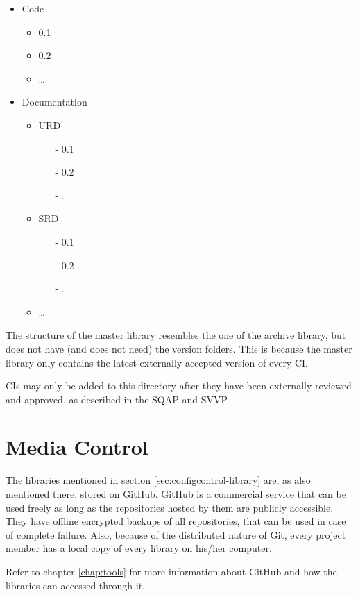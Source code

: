 \begin{itemize}
	\item Code
	\begin{itemize}
		\item 0.1
		\item 0.2
		\item \dots
	\end{itemize}
	\item Documentation
	\begin{itemize}
		\item URD
		\begin{itemize}
			\item[-] 0.1
			\item[-] 0.2
			\item[-] \dots
		\end{itemize}
		\item SRD
		\begin{itemize}
			\item[-] 0.1
			\item[-] 0.2
			\item[-] \dots
		\end{itemize}
		\item \dots
	\end{itemize}
\end{itemize}

The structure of the master library resembles the one of the archive library, but does not have (and does not need) the version folders. This is because the master library only contains the latest externally accepted version of every CI.

CIs may only be added to this directory after they have been externally reviewed and approved, as described in the SQAP \cite{sqap} and SVVP \cite{svvp}.

\section{Media Control}
\label{sec:configcontrol-media}
The libraries mentioned in section \ref{sec:configcontrol-library} are, as also mentioned there, stored on GitHub. GitHub is a commercial service that can be used freely as long as the repositories hosted by them are publicly accessible. They have offline encrypted backups of all repositories, that can be used in case of complete failure. Also, because of the distributed nature of Git, every project member has a local copy of every library on his/her computer.

Refer to chapter \ref{chap:tools} for more information about GitHub and how the libraries can accessed through it.

